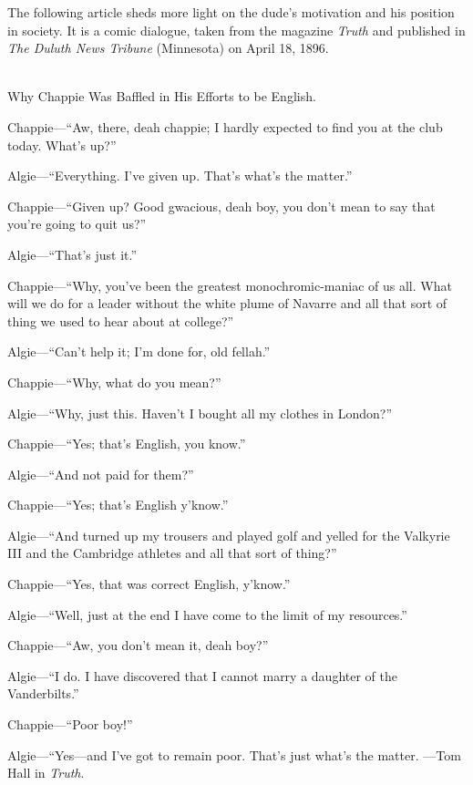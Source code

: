 The following article sheds more light on the dude’s motivation and his position in society. It is a comic dialogue, taken from the magazine \emph{Truth} and published in \emph{The Duluth News Tribune} (Minnesota) on April 18, 1896.

\begin{ipquote}
\begin{center}
\\
Why Chappie Was Baffled in His Efforts to be English.
\end{center}

Chappie—“Aw, there, deah chappie; I hardly expected to find you at the club today. What’s up?”

Algie—“Everything. I’ve given up. That’s what’s the matter.”

Chappie—“Given up? Good gwacious, deah boy, you don’t mean to say that you’re going to quit us?”

Algie—“That’s just it.”

Chappie—“Why, you’ve been the greatest monochromic-maniac of us all. What will we do for a leader without the white plume of Navarre and all that sort of thing we used to hear about at college?”

Algie—“Can’t help it; I’m done for, old fellah.”

Chappie—“Why, what do you mean?”

Algie—“Why, just this. Haven’t I bought all my clothes in London?”

Chappie—“Yes; that’s English, you know.”

Algie—“And not paid for them?”

Chappie—“Yes; that’s English y’know.”

Algie—“And turned up my trousers and played golf and yelled for the Valkyrie III and the Cambridge athletes and all that sort of thing?”

Chappie—“Yes, that was correct English, y’know.”

Algie—“Well, just at the end I have come to the limit of my resources.”

Chappie—“Aw, you don’t mean it, deah boy?”

Algie—“I do. I have discovered that I cannot marry a daughter of the Vanderbilts.”

Chappie—“Poor boy!”

Algie—“Yes—and I’ve got to remain poor. That’s just what’s the matter. —Tom Hall in \textit{Truth}.
\end{ipquote}


